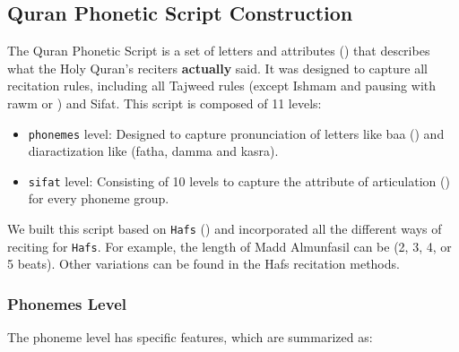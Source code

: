 \subsection{Quran Phonetic Script Construction}

The Quran Phonetic Script is a set of letters and attributes () that describes what the Holy Quran's reciters \textbf{actually} said. It was designed to capture all recitation rules, including all Tajweed rules (except Ishmam  and pausing with rawm  or ) and Sifat. This script is composed of 11 levels:

\begin{itemize}
	\item \texttt{phonemes} level: Designed to capture pronunciation of letters like baa () and diaractization like (fatha, damma and kasra).
	\item \texttt{sifat} level: Consisting of 10 levels to capture the attribute of articulation () for every phoneme group.
\end{itemize}

We built this script based on \texttt{Hafs} () and incorporated all the different ways of reciting for \texttt{Hafs}. For example, the length of Madd Almunfasil can be (2, 3, 4, or 5 beats). Other variations can be found in the Hafs recitation methods.

\subsubsection{Phonemes Level}

The phoneme level has specific features, which are summarized as:

